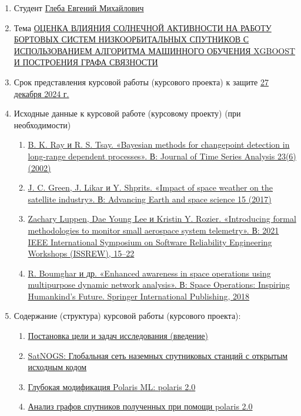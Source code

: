 \documentclass[14pt, a4paper]{extreport}
\begin{document}
\noindent 
\begin{enumerate}
\item {Студент} \uline{Глеба Евгений Михайлович}
\item {Тема} \uline{ОЦЕНКА ВЛИЯНИЯ СОЛНЕЧНОЙ АКТИВНОСТИ НА РА\-БО\-ТУ БОРТОВЫХ СИСТЕМ НИЗКООРБИТАЛЬНЫХ СПУ\-ТНИ\-КОВ С ИСПОЛЬЗОВАНИЕМ АЛГОРИТМА МАШИННОГО ОБУ\-ЧЕ\-НИЯ XGBOOST И ПОСТРОЕНИЯ ГРАФА СВЯЗНОСТИ} 
\item {Срок представления курсовой работы (курсового проекта) к защите} \underline{27 декабря 2024 г.} 
\item {Исходные данные к курсовой работе (курсовому проекту)} (при необходимости)
    \begin{enumerate}[label=\arabic{enumi}.\arabic*]
        \item \uline{B. K. Ray и R. S. Tsay. «Bayesian methods for changepoint detection in long-range dependent processes». В: Journal of Time Series Analysis 23(6) (2002)} 
        \item \uline{J. C. Green, J. Likar и Y. Shprits. «Impact of space weather on the satellite
        industry». В: Advancing Earth and space science 15 (2017)} 
        \item \uline{Zachary Luppen, Dae Young Lee и Kristin Y. Rozier. «Introducing formal methodologies to monitor small aerospace system telemetry». В: 2021 IEEE International Symposium on Software Reliability Engi\-nee\-ring Workshops (ISSREW), 15--22} 
        \item \uline{R. Boumghar и др. «Enhanced awareness in space operations using multipurpose dynamic network analysis». В: Space Operations: Inspi\-ring Humankind’s Future. Springer International Publishing, 2018} 
    \end{enumerate}
\item {Содержание (структура) курсовой работы (курсового проекта):}
    \begin{enumerate}[label=\arabic{enumi}.\arabic*]
        \item \uline{Постановка цели и задач исследования (введение)} 
        \item \uline{SatNOGS: Глобальная сеть наземных спутниковых станций с откры\-тым исходным кодом} 
        \item \uline{Глубокая модификация Polaris ML: polaris 2.0} 
        \item \uline{Анализ графов спутников полученных при помощи polaris 2.0} 
    \end{enumerate}
\end{enumerate}
\end{document}
